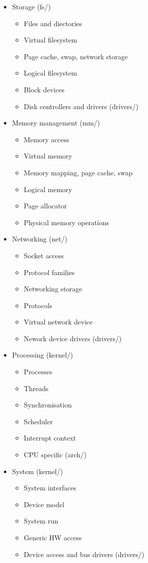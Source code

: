 \documentclass[12pt]{article}
\begin{document}
  \begin{itemize}
      \item Storage (fs/)
      \begin{itemize}
	  \item Files and diectories
	  \item Virtual filesystem
	  \item Page cache, swap, network storage
	  \item Logical filesystem
	  \item Block devices
	  \item Disk controllers and drivers (drivers/)
      \end{itemize}
      \item Memory management (mm/)
      \begin{itemize}
	  \item Memory access
	  \item Virtual memory
	  \item Memory mapping, page cache, swap
	  \item Logical memory
	  \item Page allocator
	  \item Physical memory operations
      \end{itemize}
      \item Networking (net/)
      \begin{itemize}
	  \item Socket access
	  \item Protocol families
	  \item Networking storage
	  \item Protocols
	  \item Virtual network device
	  \item Nework device drivers (drivers/)
      \end{itemize}
      \item Processing (kernel/)
      \begin{itemize}
	  \item Processes
	  \item Threads
	  \item Synchronisation
	  \item Scheduler
	  \item Interrupt context
	  \item CPU specific (arch/)
      \end{itemize}
      \item System (kernel/)
      \begin{itemize}
	  \item System interfaces
	  \item Device model
	  \item System run
	  \item Generic HW access
	  \item Device access and bus drivers (drivers/)
      \end{itemize}
  \end{itemize}
\end{document}
